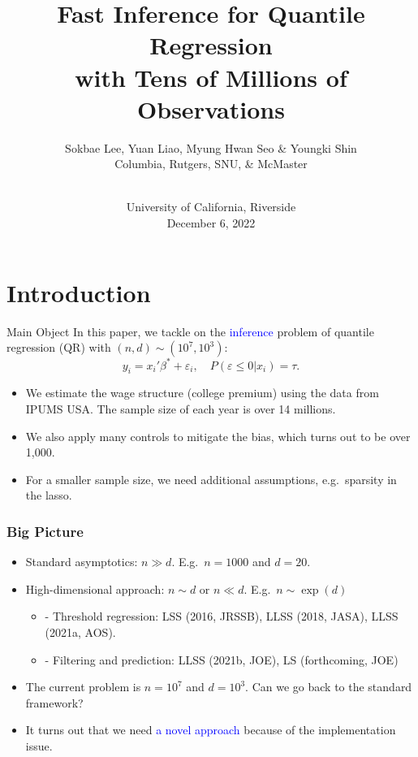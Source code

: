 \documentclass[beamer, t]{beamer}
\newcommand{\bit}{\begin{itemize}}
\newcommand{\eit}{\end{itemize}}
\newcommand{\tcb}{\textcolor{blue}}
\begin{document}
\title{Fast Inference for Quantile Regression \\ 
with Tens of Millions of Observations}
\author[Lee, Liao, Seo \& Shin]{Sokbae Lee, Yuan Liao, Myung Hwan Seo \& Youngki Shin \\
\vskip5pt
\tiny Columbia, Rutgers, SNU, \& McMaster}
\date{\\
University of California, Riverside\\
December 6, 2022}
\maketitle







\section{Introduction}


\begin{frame}{Main Object}
In this paper, we tackle on the \tcb{inference} problem of quantile regression (QR) with $(n,d)\sim(10^7,10^3)$:
		$$
		y_i = x_i'\beta^*+ \varepsilon_i,\quad P(\varepsilon\leq 0|x_i)= \tau.
		$$

	\begin{itemize}

		\item We estimate the wage structure (college premium) using the data from IPUMS USA. The sample size of each year is over 14 millions. 
		
		\item We also apply many controls to mitigate the bias, which turns out to be over 1,000. 
		
		\item For a smaller sample size, we need additional assumptions, e.g.\ sparsity in the lasso. 

		
	\end{itemize}
	
\end{frame}

\begin{frame}
\frametitle{Big Picture}
\bit
	\item Standard asymptotics: $n \gg d$. E.g.~$n=1000$ and $d=20$.
	\item High-dimensional approach: $n \sim d$ or $n \ll d$. E.g.~$n \sim \exp(d)$
	\bit
		\item[-] Threshold regression: LSS (2016, JRSSB), LLSS (2018, JASA), LLSS (2021a, AOS).
		\item[-] Filtering and prediction: LLSS (2021b, JOE), LS (forthcoming, JOE)
	\eit
	\item The current problem is $n=10^7$ and $d=10^3$. Can we go back to the standard framework?

	\item It turns out that we need \tcb{a novel approach} because of the implementation issue.
\eit
\end{frame}
\end{document}
